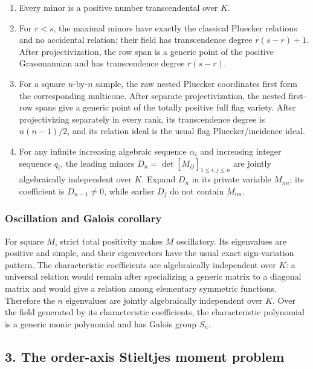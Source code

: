 \documentclass[11pt]{article}
\theoremstyle{keio}
\theoremstyle{definition}
\theoremstyle{remark}
\providecommand{\tightlist}{\setlength{\itemsep}{0pt}\setlength{\parskip}{0pt}}
\begin{document}
\begin{enumerate}
\def\labelenumi{\arabic{enumi}.}
\tightlist
\item
  Every minor is a positive number transcendental over \(K\).
\item
  For \(r<s\), the maximal minors have exactly the classical Pluecker
  relations and no accidental relation; their field has transcendence
  degree \(r(s-r)+1\). After projectivization, the row span is a generic
  point of the positive Grassmannian and has transcendence degree
  \(r(s-r)\).
\item
  For a square \(n\)-by-\(n\) sample, the raw nested Pluecker coordinates
  first form the corresponding multicone.  After separate projectivization,
  the nested first-row spans give a generic point of the totally positive
  full flag variety.
  After projectivizing separately in every rank, its transcendence degree
  is \(n(n-1)/2\), and its relation ideal is the usual flag
  Pluecker/incidence ideal.
\item
  For any infinite increasing algebraic sequence \(\alpha_i\) and increasing
  integer sequence \(q_i\), the leading minors
  \(D_n=\det[M_{ij}]_{1\le i,j\le n}\) are jointly algebraically independent
  over \(K\). Expand \(D_n\) in its private variable \(M_{nn}\); its
  coefficient is \(D_{n-1}\ne0\), while earlier \(D_j\) do not contain
  \(M_{nn}\).
\end{enumerate}

\subsubsection{Oscillation and Galois corollary}

For square \(M\), strict total positivity makes \(M\) oscillatory. Its
eigenvalues are positive and simple, and their eigenvectors have the usual
exact sign-variation pattern. The characteristic coefficients are
algebraically independent over \(K\): a universal relation would remain
after specializing a generic matrix to a diagonal matrix and would give a
relation among elementary symmetric functions. Therefore the \(n\)
eigenvalues are jointly algebraically independent over \(K\). Over the field
generated by its characteristic coefficients, the characteristic polynomial
is a generic monic polynomial and has Galois group \(S_n\).

\subsection{3. The order-axis Stieltjes moment problem}
\end{document}
